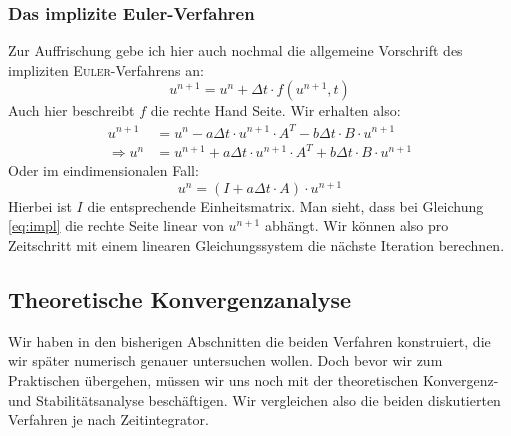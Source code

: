 \documentclass[12pt,a4paper]{scrartcl}
\numberwithin{equation}{section} %
\theoremstyle{definition}
\theoremstyle{plain}
\begin{document}
\subsubsection{Das implizite Euler-Verfahren}
Zur Auffrischung gebe ich hier auch nochmal die allgemeine Vorschrift des impliziten \textsc{Euler}-Verfahrens an:
\begin{equation}
u^{n+1}=u^n+\Delta t\cdot f(u^{n+1},t)
\end{equation}
Auch hier beschreibt $f$ die rechte Hand Seite. Wir erhalten also:
\begin{align}
u^{n+1}&=u^n-a\Delta t\cdot u^{n+1}\cdot A^T-b\Delta t\cdot B\cdot u^{n+1}\\
\Rightarrow u^n&=u^{n+1}+a\Delta t\cdot u^{n+1}\cdot A^T+b\Delta t\cdot B\cdot u^{n+1}\label{eq:impl}
\end{align}
Oder im eindimensionalen Fall:
\begin{equation}
u^n=(I+a\Delta t\cdot A)\cdot u^{n+1}
\end{equation}
Hierbei ist $I$ die entsprechende Einheitsmatrix. Man sieht, dass bei Gleichung \eqref{eq:impl} die rechte Seite linear von $u^{n+1}$ abhängt. Wir können also pro Zeitschritt mit einem linearen Gleichungssystem die nächste Iteration berechnen.
\subsection{Theoretische Konvergenzanalyse}
Wir haben in den bisherigen Abschnitten die beiden Verfahren konstruiert, die wir später numerisch genauer untersuchen wollen. Doch bevor wir zum Praktischen übergehen, müssen wir uns noch mit der theoretischen Konvergenz- und Stabilitätsanalyse beschäftigen. Wir vergleichen also die beiden diskutierten Verfahren je nach Zeitintegrator.
\end{document}
